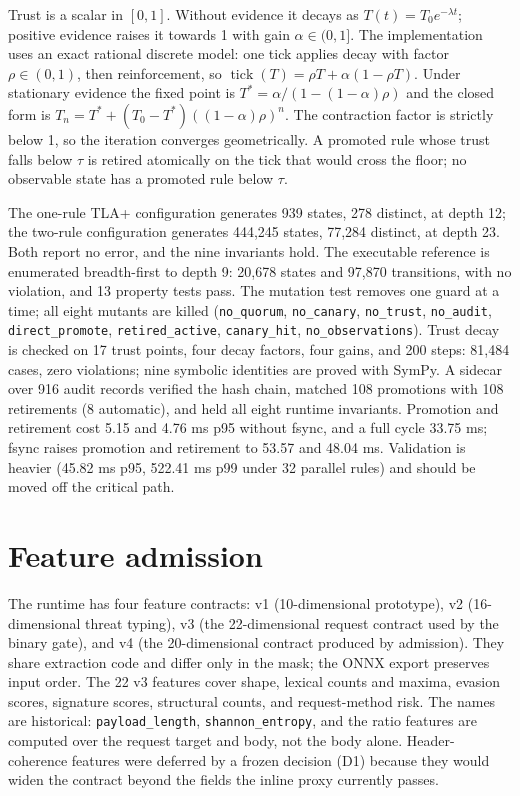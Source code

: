 \documentclass[preprint,11pt]{elsarticle}
\begin{document}
Trust is a scalar in \([0,1]\). Without evidence it decays as
\(T(t) = T_0 e^{-\lambda t}\); positive evidence raises it towards 1
with gain \(\alpha \in (0,1]\). The implementation uses an exact
rational discrete model: one tick applies decay with factor
\(\rho \in (0,1)\), then reinforcement, so
\(\operatorname{tick}(T) = \rho T + \alpha(1-\rho T)\). Under stationary
evidence the fixed point is \(T^\ast = \alpha / (1-(1-\alpha)\rho)\) and
the closed form is \(T_n = T^\ast + (T_0 - T^\ast)((1-\alpha)\rho)^n\).
The contraction factor is strictly below 1, so the iteration converges
geometrically. A promoted rule whose trust falls below \(\tau\) is
retired atomically on the tick that would cross the floor; no observable
state has a promoted rule below \(\tau\).

The one-rule TLA+ configuration generates 939 states, 278 distinct, at
depth 12; the two-rule configuration generates 444,245 states, 77,284
distinct, at depth 23. Both report no error, and the nine invariants
hold. The executable reference is enumerated breadth-first to depth 9:
20,678 states and 97,870 transitions, with no violation, and 13 property
tests pass. The mutation test removes one guard at a time; all eight
mutants are killed (\texttt{no\_\allowbreak{}quorum}, \texttt{no\_\allowbreak{}canary},
\texttt{no\_\allowbreak{}trust}, \texttt{no\_\allowbreak{}audit}, \texttt{direct\_\allowbreak{}promote},
\texttt{retired\_\allowbreak{}active}, \texttt{canary\_\allowbreak{}hit},
\texttt{no\_\allowbreak{}observations}). Trust decay is checked on 17 trust points,
four decay factors, four gains, and 200 steps: 81,484 cases, zero
violations; nine symbolic identities are proved with SymPy. A sidecar
over 916 audit records verified the hash chain, matched 108 promotions
with 108 retirements (8 automatic), and held all eight runtime
invariants. Promotion and retirement cost 5.15 and 4.76 ms p95 without
fsync, and a full cycle 33.75 ms; fsync raises promotion and retirement
to 53.57 and 48.04 ms. Validation is heavier (45.82 ms p95, 522.41 ms
p99 under 32 parallel rules) and should be moved off the critical path.

\section{Feature admission}\label{feature-admission}

The runtime has four feature contracts: v1 (10-dimensional prototype),
v2 (16-dimensional threat typing), v3 (the 22-dimensional request
contract used by the binary gate), and v4 (the 20-dimensional contract
produced by admission). They share extraction code and differ only in
the mask; the ONNX export preserves input order. The 22 v3 features
cover shape, lexical counts and maxima, evasion scores, signature
scores, structural counts, and request-method risk. The names are
historical: \texttt{payload\_\allowbreak{}length}, \texttt{shannon\_\allowbreak{}entropy}, and the
ratio features are computed over the request target and body, not the
body alone. Header-coherence features were deferred by a frozen decision
(D1) because they would widen the contract beyond the fields the inline
proxy currently passes.
\end{document}
